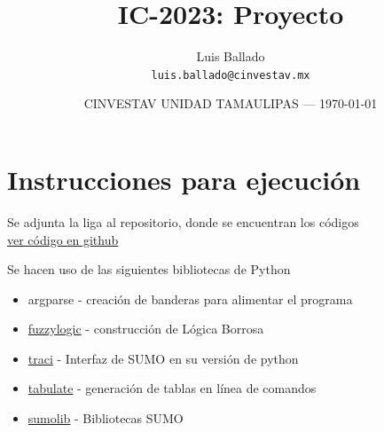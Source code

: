 \documentclass{article}
\title{IC-2023: Proyecto} %
\author{Luis Ballado\\ \texttt{luis.ballado@cinvestav.mx}} %
\date{CINVESTAV UNIDAD TAMAULIPAS --- \today} %
\begin{document}
\maketitle %


\section{Instrucciones para ejecución}

\begin{info} %
  Se adjunta la liga al repositorio, donde se encuentran los códigos\\
  \href{https://github.com/luisballado/InteligenciaComputacional/tree/master/proyecto}{ver código en github}\\
\end{info}

\begin{info} %
  Se hacen uso de las siguientes bibliotecas de Python
  \begin{itemize}
  \item argparse - creación de banderas para alimentar el programa
  \item \href{https://pypi.org/project/fuzzylogic/}{fuzzylogic}  - construcción de Lógica Borrosa
  \item \href{https://pypi.org/project/traci/}{traci} - Interfaz de SUMO en su versión de python
  \item \href{https://pypi.org/project/tabulate/}{tabulate} - generación de tablas en línea de comandos
  \item \href{https://pypi.org/project/sumolib/}{sumolib} - Bibliotecas SUMO
  \end{itemize}
\end{info}
\end{document}
